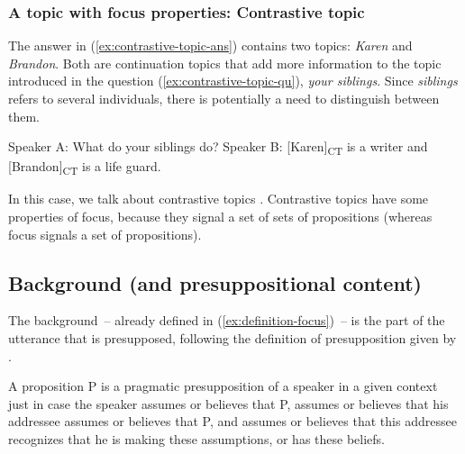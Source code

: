 \subsubsection{A topic with focus properties: Contrastive topic}

The answer in (\ref{ex:contrastive-topic-ans}) contains two topics: \emph{Karen} and \emph{Brandon}. Both are continuation topics that add more information to the topic introduced in the question (\ref{ex:contrastive-topic-qu}), \emph{your siblings}. Since \emph{siblings} refers to several individuals, there is potentially a need to distinguish between them.

\eal 
\ex Speaker A: What do your siblings do? \label{ex:contrastive-topic-qu}
\ex Speaker B: [Karen]\textsubscript{CT} is a writer and [Brandon]\textsubscript{CT} is a life guard. \label{ex:contrastive-topic-ans}
\zl 

In this case, we talk about contrastive topics \citep[44--45]{Krifka.2007}. Contrastive topics have some properties of focus, because they signal a set of sets of propositions (whereas focus signals a set of propositions). 


\subsection{Background (and presuppositional content)}
\label{ch:background}

The background~-- already defined in (\ref{ex:definition-focus})~-- is the part of the utterance that is presupposed, following the definition of presupposition given by \cite{Lambrecht.1994}. 


\ea A proposition P is a pragmatic presupposition of a speaker in a given context just in case the speaker assumes or believes that P, assumes or believes that his addressee assumes or believes that P, and assumes or believes that this addressee recognizes that he is making these assumptions, or has these beliefs. \citep[51]{Lambrecht.1994}
\z 

